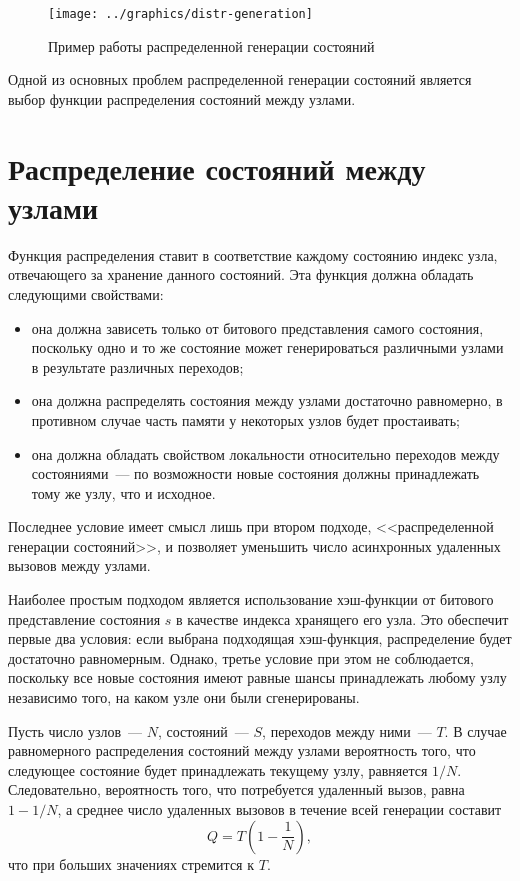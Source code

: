 \documentclass[12pt,a4paper,fleqn]{article}
\begin{document}
\begin{figure}[ht]
  \centering
  \texttt{[image: ../graphics/distr-generation]}
  \caption{Пример работы распределенной генерации состояний}
  \label{fig:distr-generation}
\end{figure}

Одной из основных проблем распределенной генерации состояний является выбор функции распределения состояний между
узлами.

\section{Распределение состояний между узлами}
\label{sec:state-partition}

Функция распределения ставит в соответствие каждому состоянию индекс узла, отвечающего за хранение данного
состояний. Эта функция должна обладать следующими свойствами:

\begin{itemize}
\item она должна зависеть только от битового представления самого состояния, поскольку одно и то же состояние
  может генерироваться различными узлами в результате различных переходов;

\item она должна распределять состояния между узлами достаточно равномерно, в противном случае часть памяти у некоторых
  узлов будет простаивать;

\item она должна обладать свойством локальности относительно переходов между состояниями~--- по возможности новые
  состояния должны принадлежать тому же узлу, что и исходное.
\end{itemize}

Последнее условие имеет смысл лишь при втором подходе, <<распределенной генерации состояний>>, и позволяет уменьшить число
асинхронных удаленных вызовов между узлами.

Наиболее простым подходом является использование хэш-функции от битового представление состояния $s$ в качестве индекса
хранящего его узла. Это обеспечит первые два условия: если выбрана подходящая хэш-функция, распределение будет
достаточно равномерным. Однако, третье условие при этом не соблюдается, поскольку все новые состояния имеют равные шансы
принадлежать любому узлу независимо того, на каком узле они были сгенерированы.

Пусть число узлов~--- $N$, состояний~--- $S$, переходов между ними~--- $T$. В случае равномерного распределения
состояний между узлами вероятность того, что следующее состояние будет принадлежать текущему узлу, равняется
$1/N$. Следовательно, вероятность того, что потребуется удаленный вызов, равна $1 - 1/N$, а среднее число удаленных
вызовов в течение всей генерации составит 
\begin{equation}
  \label{eq:rpc-partfull}
  Q = T (1 - \frac{1}{N}),
\end{equation}
что при больших значениях стремится к $T$.
\end{document}
